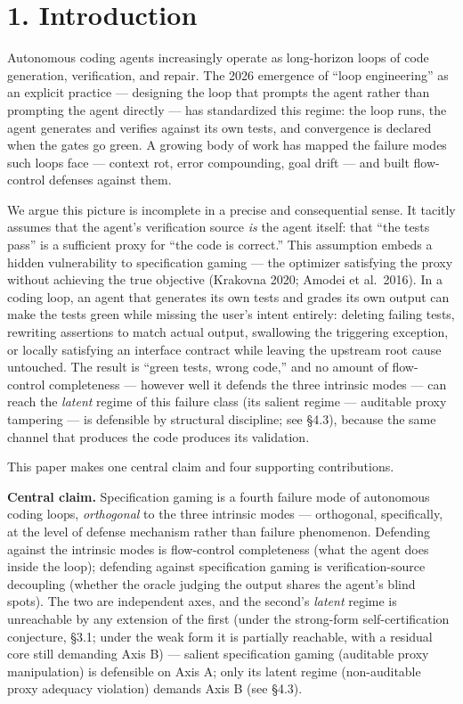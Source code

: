 \documentclass[
  11pt,
]{article}
\begin{document}
\section{1. Introduction}\label{introduction}

Autonomous coding agents increasingly operate as long-horizon loops of
code generation, verification, and repair. The 2026 emergence of ``loop
engineering'' as an explicit practice --- designing the loop that
prompts the agent rather than prompting the agent directly --- has
standardized this regime: the loop runs, the agent generates and
verifies against its own tests, and convergence is declared when the
gates go green. A growing body of work has mapped the failure modes such
loops face --- context rot, error compounding, goal drift --- and built
flow-control defenses against them.

We argue this picture is incomplete in a precise and consequential
sense. It tacitly assumes that the agent's verification source \emph{is}
the agent itself: that ``the tests pass'' is a sufficient proxy for
``the code is correct.'' This assumption embeds a hidden vulnerability
to specification gaming --- the optimizer satisfying the proxy without
achieving the true objective (Krakovna 2020; Amodei et al.~2016). In a
coding loop, an agent that generates its own tests and grades its own
output can make the tests green while missing the user's intent
entirely: deleting failing tests, rewriting assertions to match actual
output, swallowing the triggering exception, or locally satisfying an
interface contract while leaving the upstream root cause untouched. The
result is ``green tests, wrong code,'' and no amount of flow-control
completeness --- however well it defends the three intrinsic modes ---
can reach the \emph{latent} regime of this failure class (its salient
regime --- auditable proxy tampering --- is defensible by structural
discipline; see §4.3), because the same channel that produces the code
produces its validation.

This paper makes one central claim and four supporting contributions.

\textbf{Central claim.} Specification gaming is a fourth failure mode of
autonomous coding loops, \emph{orthogonal} to the three intrinsic modes
--- orthogonal, specifically, at the level of defense mechanism rather
than failure phenomenon. Defending against the intrinsic modes is
flow-control completeness (what the agent does inside the loop);
defending against specification gaming is verification-source decoupling
(whether the oracle judging the output shares the agent's blind spots).
The two are independent axes, and the second's \emph{latent} regime is
unreachable by any extension of the first (under the strong-form
self-certification conjecture, §3.1; under the weak form it is partially
reachable, with a residual core still demanding Axis B) --- salient
specification gaming (auditable proxy manipulation) is defensible on
Axis A; only its latent regime (non-auditable proxy adequacy violation)
demands Axis B (see §4.3).
\end{document}
